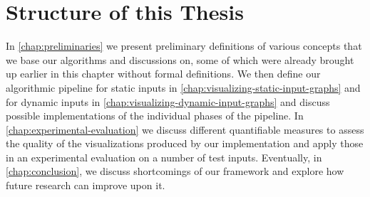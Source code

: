 \section{Structure of this Thesis}
\label{sect:structure-of-this-thesis}

In \cref{chap:preliminaries} we present preliminary definitions of various concepts that we base our algorithms and discussions on, some of which were already brought up earlier in this chapter without formal definitions.
We then define our algorithmic pipeline for static inputs in \cref{chap:visualizing-static-input-graphs} and for dynamic inputs in \cref{chap:visualizing-dynamic-input-graphs} and discuss possible implementations of the individual phases of the pipeline.
In \cref{chap:experimental-evaluation} we discuss different quantifiable measures to assess the quality of the visualizations produced by our implementation and apply those in an experimental evaluation on a number of test inputs.
Eventually, in \cref{chap:conclusion}, we discuss shortcomings of our framework and explore how future research can improve upon it.
